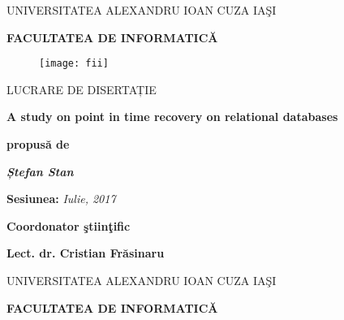 \begin{titlepage}
	\begin{center}
		\normalsize
		\hspace{1.9cm}		
		\textsf{UNIVERSITATEA ALEXANDRU IOAN CUZA IAŞI}
		\newline
		
		\vspace{0.1cm}
		\Large
		\textbf{FACULTATEA DE INFORMATICĂ}
		
		\vspace{2.75cm}
		\begin{figure}[h]
			\centering
    		\texttt{[image: fii]}
		\end{figure}	

		\vspace{2.65cm}
		  
		{\fontsize{18}{21.6}\selectfont LUCRARE DE DISERTAȚIE\par}

		\vspace{1.2cm}
		\Huge
		\textbf{A study on point in time recovery on relational databases}		
		
		\vspace{1.2cm}		
		\Large
		\textbf{propusă de}		

		\vspace{1cm}
		\huge
		\textit{\textbf{Ștefan Stan}}		
		
		\vspace{1.1cm}
		{\fontsize{18}{21,6}\selectfont 		
		\textbf{Sesiunea: }
		\textit{Iulie, 2017}\par}		
		
		\vspace{2.2cm}
		{\fontsize{14}{18}\selectfont 		
		\textbf{Coordonator ştiinţific}\par}			
		
		\vspace{0.5cm}
		{\fontsize{18}{21,6}\selectfont 		
		\textbf{Lect. dr. Cristian Frăsinaru}\par}	
		
		\newpage
		
		\thispagestyle{empty} 
		\normalsize
		\hspace{1.9cm}		
		\textsf{UNIVERSITATEA ALEXANDRU IOAN CUZA IAŞI}
		\newline
		
		\vspace{0.1cm}
		\Large
		\textbf{FACULTATEA DE INFORMATICĂ}
		
		\vspace{7cm}


\end{center}
\end{titlepage}
